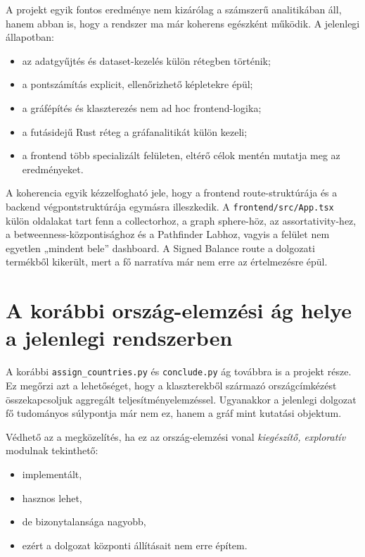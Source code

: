 A projekt egyik fontos eredménye nem kizárólag a számszerű analitikában áll, hanem abban is, hogy a rendszer ma már koherens egészként működik. A jelenlegi állapotban:

\begin{itemize}
    \item az adatgyűjtés és dataset-kezelés külön rétegben történik;
    \item a pontszámítás explicit, ellenőrizhető képletekre épül;
    \item a gráfépítés és klaszterezés nem ad hoc frontend-logika;
    \item a futásidejű Rust réteg a gráfanalitikát külön kezeli;
    \item a frontend több specializált felületen, eltérő célok mentén mutatja meg az eredményeket.
\end{itemize}

A koherencia egyik kézzelfogható jele, hogy a frontend route-struktúrája és a backend végpontstruktúrája egymásra illeszkedik. A \texttt{frontend/src/App.tsx} külön oldalakat tart fenn a collectorhoz, a graph sphere-höz, az assortativity-hez, a betweenness-központisághoz és a Pathfinder Labhoz, vagyis a felület nem egyetlen „mindent bele” dashboard. A Signed Balance route a dolgozati termékből kikerült, mert a fő narratíva már nem erre az értelmezésre épül.

\section{A korábbi ország-elemzési ág helye a jelenlegi rendszerben}

A korábbi \texttt{assign\_countries.py} és \texttt{conclude.py} ág továbbra is a projekt része. Ez megőrzi azt a lehetőséget, hogy a klaszterekből származó országcímkézést összekapcsoljuk aggregált teljesítményelemzéssel. Ugyanakkor a jelenlegi dolgozat fő tudományos súlypontja már nem ez, hanem a gráf mint kutatási objektum.

Védhető az a megközelítés, ha ez az ország-elemzési vonal \emph{kiegészítő, exploratív} modulnak tekinthető:

\begin{itemize}
    \item implementált,
    \item hasznos lehet,
    \item de bizonytalansága nagyobb,
    \item ezért a dolgozat központi állításait nem erre építem.
\end{itemize}

